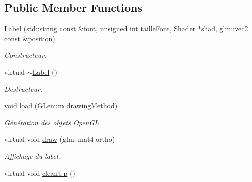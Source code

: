 \subsection*{Public Member Functions}
\begin{DoxyCompactItemize}
\item 
\hypertarget{classLabel_a89439b76cefcfc6b560c2920e987072a}{\hyperlink{classLabel_a89439b76cefcfc6b560c2920e987072a}{Label} (std\+::string const \&font, unsigned int taille\+Font, \hyperlink{classShader}{Shader} $\ast$shad, glm\+::vec2 const \&position)}\label{classLabel_a89439b76cefcfc6b560c2920e987072a}

\begin{DoxyCompactList}\small\item\em Constructeur. \end{DoxyCompactList}\item 
\hypertarget{classLabel_a39e1167a9b5827afd888780973d88894}{virtual \hyperlink{classLabel_a39e1167a9b5827afd888780973d88894}{$\sim$\+Label} ()}\label{classLabel_a39e1167a9b5827afd888780973d88894}

\begin{DoxyCompactList}\small\item\em Destructeur. \end{DoxyCompactList}\item 
\hypertarget{classLabel_a60d568210a67b61388a47fca5326beee}{void \hyperlink{classLabel_a60d568210a67b61388a47fca5326beee}{load} (G\+Lenum drawing\+Method)}\label{classLabel_a60d568210a67b61388a47fca5326beee}

\begin{DoxyCompactList}\small\item\em Génération des objets Open\+G\+L. \end{DoxyCompactList}\item 
\hypertarget{classLabel_ae8ac49d6d22dc837418dce2ea3c01637}{virtual void \hyperlink{classLabel_ae8ac49d6d22dc837418dce2ea3c01637}{draw} (glm\+::mat4 ortho)}\label{classLabel_ae8ac49d6d22dc837418dce2ea3c01637}

\begin{DoxyCompactList}\small\item\em Affichage du label. \end{DoxyCompactList}\item 
\hypertarget{classLabel_afe0eb04dde9253dae986980ab7af5e28}{virtual void \hyperlink{classLabel_afe0eb04dde9253dae986980ab7af5e28}{clean\+Up} ()}\label{classLabel_afe0eb04dde9253dae986980ab7af5e28}


\end{DoxyCompactItemize}
